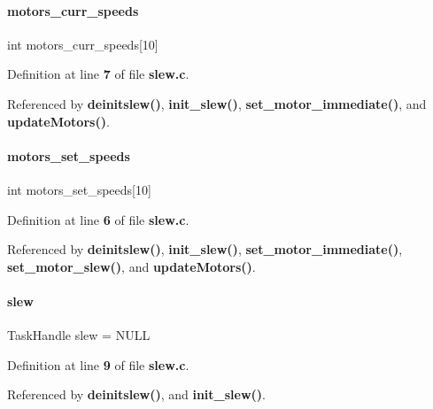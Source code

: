 \paragraph{motors\+\_\+curr\+\_\+speeds}
{\footnotesize\ttfamily int motors\+\_\+curr\+\_\+speeds[10]\hspace{0.3cm}{\ttfamily [static]}}



Definition at line \textbf{ 7} of file \textbf{ slew.\+c}.



Referenced by \textbf{ deinitslew()}, \textbf{ init\+\_\+slew()}, \textbf{ set\+\_\+motor\+\_\+immediate()}, and \textbf{ update\+Motors()}.

\mbox{\label{a00143_acf7558ed17fdecd298ea7eb82291c7d0}} 
\paragraph{motors\+\_\+set\+\_\+speeds}
{\footnotesize\ttfamily int motors\+\_\+set\+\_\+speeds[10]\hspace{0.3cm}{\ttfamily [static]}}



Definition at line \textbf{ 6} of file \textbf{ slew.\+c}.



Referenced by \textbf{ deinitslew()}, \textbf{ init\+\_\+slew()}, \textbf{ set\+\_\+motor\+\_\+immediate()}, \textbf{ set\+\_\+motor\+\_\+slew()}, and \textbf{ update\+Motors()}.

\mbox{\label{a00143_a9dc30877eadbb32ceb6bede027c9a93f}} 
\paragraph{slew}
{\footnotesize\ttfamily Task\+Handle slew = N\+U\+LL\hspace{0.3cm}{\ttfamily [static]}}



Definition at line \textbf{ 9} of file \textbf{ slew.\+c}.



Referenced by \textbf{ deinitslew()}, and \textbf{ init\+\_\+slew()}.

\mbox{\label{a00143_a29ddd4c66a52ff81b441d04f9f6d9318}} 
